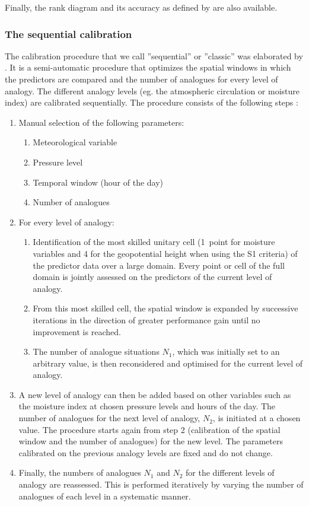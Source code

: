 \documentclass[review]{elsarticle}
\begin{document}
Finally, the rank diagram \citep{Talagrand1997} and its accuracy as defined by \citet{Candille2005} are also available.


\subsubsection{The sequential calibration}
\label{sec:sequential}

The calibration procedure that we call ''sequential'' or ''classic'' was elaborated by \citet{Bontron2004} \cite[see also][]{Radanovics2013, BenDaoud2016}. It is a semi-automatic procedure that optimizes the spatial windows in which the predictors are compared and the number of analogues for every level of analogy. The different analogy levels (eg. the atmospheric circulation or moisture index) are calibrated sequentially. The procedure consists of the following steps \citep{Bontron2004}:

\begin{enumerate}
	\item Manual selection of the following parameters:
	\begin{enumerate}
		\item Meteorological variable
		\item Pressure level
		\item Temporal window (hour of the day)
		\item Number of analogues
	\end{enumerate}
	
	\item For every level of analogy:
	\begin{enumerate}
		\item Identification of the most skilled unitary cell (1~point for moisture variables and 4 for the geopotential height when using the S1 criteria) of the predictor data over a large domain. Every point or cell of the full domain is jointly assessed on the predictors of the current level of analogy.
		\item From this most skilled cell, the spatial window is expanded by successive iterations in the direction of greater performance gain until no improvement is reached.
		\item The number of analogue situations $N_{1}$, which was initially set to an arbitrary value, is then reconsidered and optimised for the current level of analogy.
	\end{enumerate}
	\item A new level of analogy can then be added based on other variables such as the moisture index at chosen pressure levels and hours of the day. The number of analogues for the next level of analogy, $N_{2}$, is initiated at a chosen value. The procedure starts again from step 2 (calibration of the spatial window and the number of analogues) for the new level. The parameters calibrated on the previous analogy levels are fixed and do not change. 
	\item Finally, the numbers of analogues $N_{1}$ and $N_{2}$ for the different levels of analogy are reassessed. This is performed iteratively by varying the number of analogues of each level in a systematic manner.
\end{enumerate}
\end{document}
